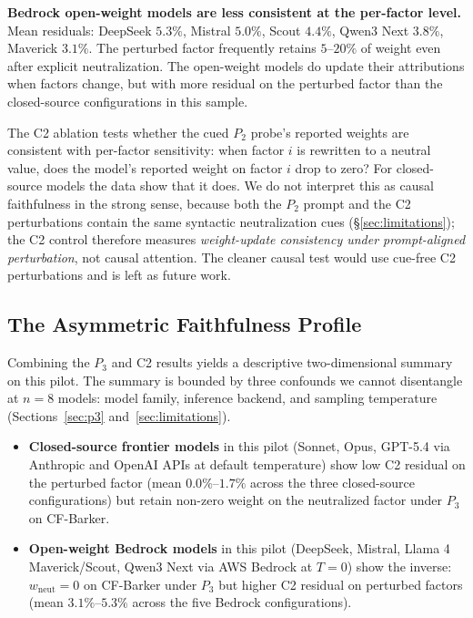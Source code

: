 \documentclass[11pt]{article}
\begin{document}
\textbf{Bedrock open-weight models are less consistent at the per-factor level.} Mean residuals: DeepSeek $5.3\%$, Mistral $5.0\%$, Scout $4.4\%$, Qwen3 Next $3.8\%$, Maverick $3.1\%$. The perturbed factor frequently retains $5$--$20\%$ of weight even after explicit neutralization. The open-weight models do update their attributions when factors change, but with more residual on the perturbed factor than the closed-source configurations in this sample.

The C2 ablation tests whether the cued $P_2$ probe's reported weights are consistent with per-factor sensitivity: when factor $i$ is rewritten to a neutral value, does the model's reported weight on factor $i$ drop to zero? For closed-source models the data show that it does. We do not interpret this as causal faithfulness in the strong sense, because both the $P_2$ prompt and the C2 perturbations contain the same syntactic neutralization cues (\S\ref{sec:limitations}); the C2 control therefore measures \emph{weight-update consistency under prompt-aligned perturbation}, not causal attention. The cleaner causal test would use cue-free C2 perturbations and is left as future work.

\subsection{The Asymmetric Faithfulness Profile}

Combining the $P_3$ and C2 results yields a descriptive two-dimensional summary on this pilot. The summary is bounded by three confounds we cannot disentangle at $n = 8$ models: model family, inference backend, and sampling temperature (Sections~\ref{sec:p3} and~\ref{sec:limitations}).

\begin{itemize}
\item \textbf{Closed-source frontier models} in this pilot (Sonnet, Opus, GPT-5.4 via Anthropic and OpenAI APIs at default temperature) show low C2 residual on the perturbed factor (mean $0.0\%$--$1.7\%$ across the three closed-source configurations) but retain non-zero weight on the neutralized factor under $P_3$ on CF-Barker.
\item \textbf{Open-weight Bedrock models} in this pilot (DeepSeek, Mistral, Llama 4 Maverick/Scout, Qwen3 Next via AWS Bedrock at $T = 0$) show the inverse: $w_{\text{neut}} = 0$ on CF-Barker under $P_3$ but higher C2 residual on perturbed factors (mean $3.1\%$--$5.3\%$ across the five Bedrock configurations).
\end{itemize}
\end{document}
